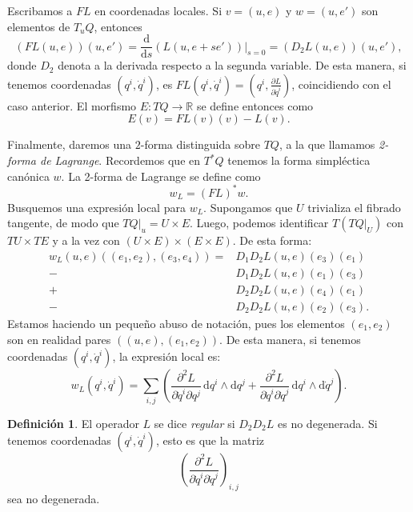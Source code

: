 \documentclass[11pt, a4paper]{article}
\newcommand{\RR}{\mathbb{R}}
\newcommand{\dd}{\mathrm{d}}
\newcommand{\dds}{\frac{\dd}{\dd s}}
\newcommand{\pardev}[2]{\frac{\partial #1}{\partial #2}}
\theoremstyle{plain}
\theoremstyle{definition}
\newtheorem{defn}[prop]{Definición}
\begin{document}
Escribamos a $FL$ en coordenadas locales. Si $v=(u,e)$ y $w=(u,e')$ son elementos de $T_uQ$, entonces
\[\left(FL(u,e)\right)(u,e') = \dds\left(L(u,e+se')\right)\bigg|_{s=0}=(D_2L(u,e))(u,e'),\]
donde $D_2$ denota a la derivada respecto a la segunda variable. De esta manera, si tenemos coordenadas $(q^i,\dot{q}^i)$, es $FL(q^i, \dot{q}^i)=(q^i,\pardev{L}{\dot{q}^i})$, coincidiendo con el caso anterior. El morfismo $E:TQ\to \RR$ se define entonces como
\[E(v)=FL(v)(v)-L(v).\]

Finalmente, daremos una $2$-forma distinguida sobre $TQ$, a la que llamamos \emph{2-forma de Lagrange}. Recordemos que en $T^*Q$ tenemos la forma simpléctica canónica $w$. La 2-forma de Lagrange se define como
\[w_L = (FL)^*w.\]
Busquemos una expresión local para $w_L$. Supongamos que $U$ trivializa el fibrado tangente, de modo que $TQ|_u=U\times E$. Luego, podemos identificar $T(TQ|_U)$ con $TU\times TE$ y a la vez con $(U\times E)\times(E\times E)$. De esta forma:
\begin{align*}
w_L(u,e)((e_1,e_2),(e_3,e_4))= &D_1D_2L(u,e)(e_3)(e_1)\\
-&D_1D_2L(u,e)(e_1)(e_3)\\
+&D_2D_2L(u,e)(e_4)(e_1)\\
-&D_2D_2L(u,e)(e_2)(e_3).
\end{align*}
Estamos haciendo un pequeño abuso de notación, pues los elementos $(e_1,e_2)$ son en realidad pares $((u,e),(e_1,e_2))$. De esta manera, si tenemos coordenadas $(q^i,\dot{q}^i)$, la expresión local es:
\[w_L(q^i,\dot{q}^i)=\sum_{i,j} \left(\frac{\partial^2 L}{\partial\dot{q}^i\partial q^j}\,\dd q^i\wedge \dd q^j + \frac{\partial^2 L}{\partial\dot{q}^i\partial\dot{q}^j}\,\dd q^i\wedge \dd \dot{q}^j \right).\]

\begin{defn} El operador $L$ se dice \emph{regular} si $D_2D_2 L$ es no degenerada. Si tenemos coordenadas $(q^i,\dot{q}^i)$, esto es que la matriz
\[\left( \frac{\partial^2 L}{\partial\dot{q}^i\partial\dot{q}^j} \right)_{i,j} \]
sea no degenerada.
\end{defn}
\end{document}
